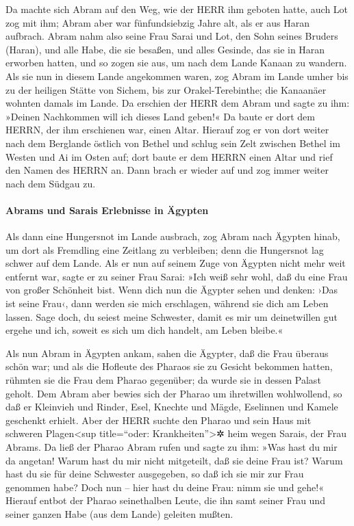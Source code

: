  Da machte sich Abram auf den Weg, wie der HERR ihm
geboten hatte, auch Lot zog mit ihm; Abram aber war fünfundsiebzig Jahre
alt, als er aus Haran aufbrach.  Abram nahm also seine
Frau Sarai und Lot, den Sohn seines Bruders (Haran), und alle Habe, die
sie besaßen, und alles Gesinde, das sie in Haran erworben hatten, und so
zogen sie aus, um nach dem Lande Kanaan zu wandern. Als sie nun in
diesem Lande angekommen waren,  zog Abram im Lande umher
bis zu der heiligen Stätte von Sichem, bis zur Orakel-Terebinthe; die
Kanaanäer wohnten damals im Lande.  Da erschien der HERR
dem Abram und sagte zu ihm: »Deinen Nachkommen will ich dieses Land
geben!« Da baute er dort dem HERRN, der ihm erschienen war, einen Altar.
 Hierauf zog er von dort weiter nach dem Berglande östlich
von Bethel und schlug sein Zelt zwischen Bethel im Westen und Ai im
Osten auf; dort baute er dem HERRN einen Altar und rief den Namen des
HERRN an.  Dann brach er wieder auf und zog immer weiter
nach dem Südgau zu.

\hypertarget{abrams-und-sarais-erlebnisse-in-uxe4gypten}{%
\paragraph{Abrams und Sarais Erlebnisse in
Ägypten}\label{abrams-und-sarais-erlebnisse-in-uxe4gypten}}

 Als dann eine Hungersnot im Lande ausbrach, zog Abram
nach Ägypten hinab, um dort als Fremdling eine Zeitlang zu verbleiben;
denn die Hungersnot lag schwer auf dem Lande.  Als er nun
auf seinem Zuge von Ägypten nicht mehr weit entfernt war, sagte er zu
seiner Frau Sarai: »Ich weiß sehr wohl, daß du eine Frau von großer
Schönheit bist.  Wenn dich nun die Ägypter sehen und
denken: ›Das ist seine Frau‹, dann werden sie mich erschlagen, während
sie dich am Leben lassen.  Sage doch, du seiest meine
Schwester, damit es mir um deinetwillen gut ergehe und ich, soweit es
sich um dich handelt, am Leben bleibe.«

 Als nun Abram in Ägypten ankam, sahen die Ägypter, daß
die Frau überaus schön war;  und als die Hofleute des
Pharaos sie zu Gesicht bekommen hatten, rühmten sie die Frau dem Pharao
gegenüber; da wurde sie in dessen Palast geholt.  Dem
Abram aber bewies sich der Pharao um ihretwillen wohlwollend, so daß er
Kleinvieh und Rinder, Esel, Knechte und Mägde, Eselinnen und Kamele
geschenkt erhielt.  Aber der HERR suchte den Pharao und
sein Haus mit schweren Plagen\textless sup title=``oder:
Krankheiten''\textgreater✲ heim wegen Sarais, der Frau Abrams.
 Da ließ der Pharao Abram rufen und sagte zu ihm: »Was
hast du mir da angetan! Warum hast du mir nicht mitgeteilt, daß sie
deine Frau ist?  Warum hast du sie für deine Schwester
ausgegeben, so daß ich sie mir zur Frau genommen habe? Doch nun -- hier
hast du deine Frau: nimm sie und gehe!«  Hierauf entbot
der Pharao seinethalben Leute, die ihn samt seiner Frau und seiner
ganzen Habe (aus dem Lande) geleiten mußten.

